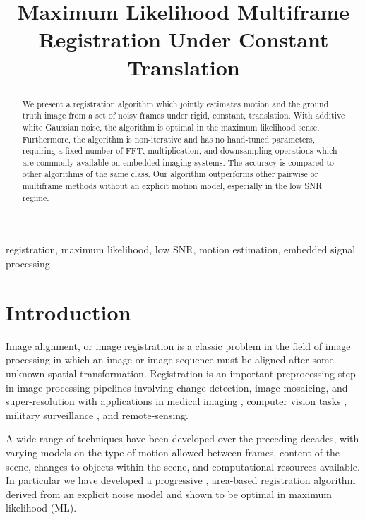 \documentclass{article}
\title{Maximum Likelihood Multiframe Registration Under Constant Translation}
\begin{document}
\maketitle
\begin{abstract}
  We present a registration algorithm which jointly estimates motion and the ground truth image from a set of noisy frames under rigid, constant, translation.  With additive white Gaussian noise, the algorithm is optimal in the maximum likelihood sense.  Furthermore, the algorithm is non-iterative and has no hand-tuned parameters, requiring a fixed number of FFT, multiplication, and downsampling operations which are commonly available on embedded imaging systems.  The accuracy is compared to other algorithms of the same class.  Our algorithm outperforms other pairwise or multiframe methods without an explicit motion model, especially in the low SNR regime.
\end{abstract}

\begin{keywords}
  registration, maximum likelihood, low SNR, motion estimation, embedded signal processing
\end{keywords}

\section{Introduction}
\label{sec:introduction}

Image alignment, or image registration is a classic problem in the field of image processing in which an image or image sequence must be aligned after some unknown spatial transformation.
Registration is an important preprocessing step in image processing pipelines involving change detection, image mosaicing, and super-resolution with applications in medical imaging \cite{wells1996multi}, computer vision tasks \cite{mers}, military surveillance \cite{konrad}, and remote-sensing.

A wide range of techniques have been developed over the preceding decades, with varying models on the type of motion allowed between frames, content of the scene, changes to objects within the scene, and computational resources available.  In particular we have developed a progressive \cite{robinson2004fundamental}, area-based \cite{zitova2003image} \cite{brown1992survey} registration algorithm derived from an explicit noise model and shown to be optimal in maximum likelihood (ML).
\end{document}
